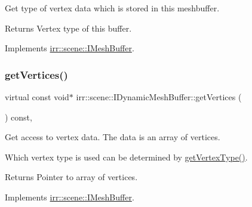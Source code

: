 Get type of vertex data which is stored in this meshbuffer. 

\begin{DoxyReturn}{Returns}
Vertex type of this buffer. 
\end{DoxyReturn}


Implements \hyperlink{classirr_1_1scene_1_1IMeshBuffer_a4d7a84ae4416487736f0ed0f519bb4f0}{irr\+::scene\+::\+I\+Mesh\+Buffer}.

\mbox{\label{classirr_1_1scene_1_1IDynamicMeshBuffer_a433e0e8ec301ce898dc373ca65e30e85}} 
\subsubsection{\texorpdfstring{get\+Vertices()}{getVertices()}\hspace{0.1cm}{\footnotesize\ttfamily [1/4]}}
{\footnotesize\ttfamily virtual const void$\ast$ irr\+::scene\+::\+I\+Dynamic\+Mesh\+Buffer\+::get\+Vertices (\begin{DoxyParamCaption}{ }\end{DoxyParamCaption}) const\hspace{0.3cm}{\ttfamily [inline]}, {\ttfamily [virtual]}}



Get access to vertex data. The data is an array of vertices. 

Which vertex type is used can be determined by \hyperlink{classirr_1_1scene_1_1IDynamicMeshBuffer_a3e7523774efaf9a177de6396dfdc14e2}{get\+Vertex\+Type()}. \begin{DoxyReturn}{Returns}
Pointer to array of vertices. 
\end{DoxyReturn}


Implements \hyperlink{classirr_1_1scene_1_1IMeshBuffer_a99891e516246b2cff13b362a435c8028}{irr\+::scene\+::\+I\+Mesh\+Buffer}.

\mbox{\label{classirr_1_1scene_1_1IDynamicMeshBuffer_a433e0e8ec301ce898dc373ca65e30e85}} 
